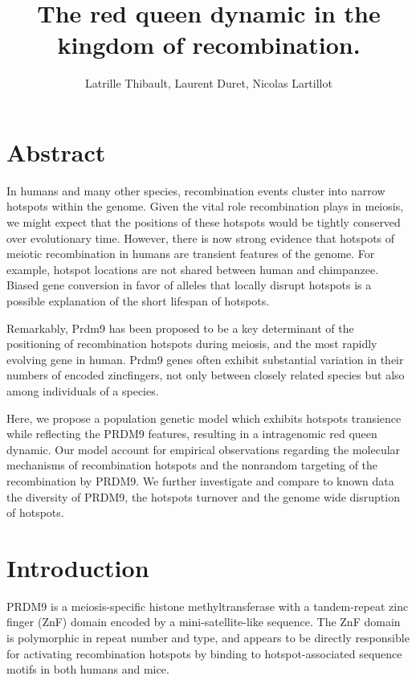 \documentclass{article}
\author{Latrille Thibault, Laurent Duret, Nicolas Lartillot}
\title{The red queen dynamic in the kingdom of recombination.}
\begin{document}
\maketitle 

\newcommand{\Ne}{N_\mathrm{e}}


\section{Abstract}

In humans and many other species, recombination events cluster into narrow hotspots within the genome. Given the vital role recombination plays in meiosis, we might expect that the positions of these hotspots would be tightly conserved over evolutionary time. However, there is now strong evidence that hotspots of meiotic recombination in humans are transient features of the genome. For example, hotspot locations are not shared between human and chimpanzee. Biased gene conversion in favor of alleles that locally disrupt hotspots is a possible explanation of the short lifespan of hotspots.

Remarkably, Prdm9 has been proposed to be a key determinant of the positioning of recombination hotspots during meiosis, and the most rapidly evolving gene in human. Prdm9 genes often exhibit substantial variation in their numbers of encoded zincfingers, not only between closely related species but also among individuals of a species.

Here, we propose a population genetic model which exhibits hotspots transience while reflecting the PRDM9 features, resulting in a intragenomic red queen dynamic. Our model account for empirical observations regarding the molecular mechanisms of recombination hotspots and the nonrandom targeting of the recombination by PRDM9. We further investigate and compare to known data the diversity of PRDM9, the hotspots turnover and the genome wide disruption of hotspots.


\section{Introduction}

PRDM9 is a meiosis-specific histone methyltransferase with a tandem-repeat zinc finger (ZnF) domain encoded by a mini-satellite-like sequence. The ZnF domain is polymorphic in repeat number and type, and appears to be directly responsible for activating recombination hotspots by binding to hotspot-associated sequence motifs in both humans and mice.
\end{document}

